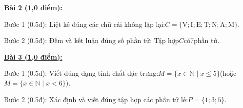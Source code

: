 \documentclass[11pt,a4paper]{article}
\begin{document}
\noindent\textbf{\underline{Bài 2 (1,0 điểm):}}\par\vspace{3pt}
Bước 1 (0.5đ): Liệt kê đúng các chữ cái không lặp lại:$C = \{\text{V}; \text{I}; \text{E}; \text{T}; \text{N}; \text{A}; \text{M}\}$.\par\noindent Bước 2 (0.5đ): Đếm và kết luận đúng số phần tử: Tập hợp$C$có$7$phần tử.\par\vspace{8pt}

\noindent\textbf{\underline{Bài 3 (1,0 điểm):}}\par\vspace{3pt}
Bước 1 (0.5đ): Viết đúng dạng tính chất đặc trưng:$M = \{x \in \mathbb{N} \mid x \le 5\}$(hoặc$M = \{x \in \mathbb{N} \mid x < 6\}$).\par\noindent Bước 2 (0.5đ): Xác định và viết đúng tập hợp các phần tử lẻ:$P = \{1; 3; 5\}$.\par\vspace{8pt}
\end{document}

